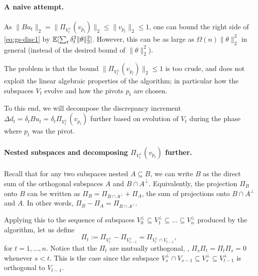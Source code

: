 \paragraph{A naive attempt.} 
As $\|Bu_t\|_2 = \|\Pi_{V_t^\perp}(v_{p_t})\|_2 \leq \|v_{p_t}\|_2 \leq 1$, one can bound the right side of \eqref{eq:gs-disc1}
 by $\mathbb{E}[\sum_t \delta_t^2 \|\theta\|_2^2]$. However, this can be as large as $\Omega(n)\|
\theta\|_2^2$ in general (instead of the desired bound of $\|\theta\|_2^2$).

The problem is that the bound $\|\Pi_{V_t^\perp}(v_{p_t})\|_2 \leq 1 $ is too crude, and does not exploit the linear algebraic properties of the algorithm; in particular how the subspaces $V_t$ evolve and how the pivots $p_t$ are chosen. 


To this end, we  will decompose the discrepancy increment $\Delta d_t = \delta_t Bu_t = \delta_t \Pi_{V_t^\perp}(v_{p_t})$ further based on evolution of $V_t$ during the phase where $p_t$ was the pivot. 

\paragraph{Nested subspaces and decomposing $\Pi_{V_t^\perp}(v_{p_t})$ further.}
 Recall that for any two subspaces nested $A\subseteq B$, we can
 write $B$ as the direct sum of the orthogonal subspaces $A$ and $B \cap A^\perp$. Equivalently,  
 the projection $\Pi_{B}$ onto $B$ can be written as  $\Pi_{B} =
 \Pi_{B \cap A^\perp} + \Pi_{A}$, the sum of projections onto $B \cap
 A^\perp$ and $A$. In other words, $\Pi_{B} - \Pi_A = \Pi_{B \cap A^\perp}$.

Applying this to the sequence of subspaces $V_0^\perp \subseteq V_1^\perp \subseteq \ldots \subseteq V_n^\perp$ produced by the algorithm, let us define 
\begin{equation}
\label{eq:gs-pi_t} \Pi_t :=   \Pi_{V_t^\perp}  - \Pi_{V_{t-1}^\perp} = \Pi_{V_t^\perp \cap V_{t-1}},  \end{equation}
 for $t=1,\ldots,n$. Notice that the $\Pi_t$ are mutually orthogonal,
 \ie, $\Pi_{s}\Pi_{t} = \Pi_t \Pi_s = 0$ whenever $s < t$. This is the case since
 the subspace $V_{s}^\perp \cap V_{s-1} \subseteq V_s^\perp \subseteq
 V_{t-1}^\perp$ is orthogonal to $V_{t-1}$.
 

